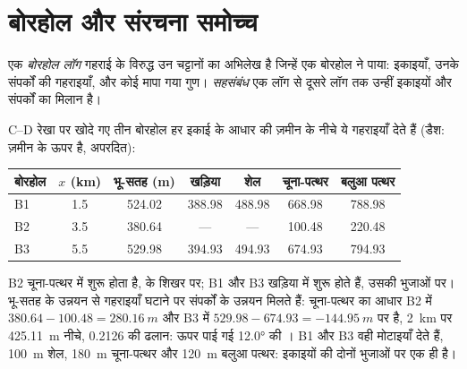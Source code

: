 \section{बोरहोल और संरचना समोच्च}\label{sec:b1:cross-sections:boreholes}

\begin{definition}[बोरहोल लॉग, सहसंबंध]\label{def:b1:cross-sections:log}
एक \emph{बोरहोल लॉग} गहराई के विरुद्ध उन चट्टानों का अभिलेख है जिन्हें एक बोरहोल ने पाया:
इकाइयाँ, उनके संपर्कों की गहराइयाँ, और कोई मापा गया गुण। \emph{सहसंबंध} एक लॉग से
दूसरे लॉग तक उन्हीं इकाइयों और संपर्कों का मिलान है।
\end{definition}

C--D रेखा पर खोदे गए तीन बोरहोल हर इकाई के आधार की ज़मीन के नीचे ये गहराइयाँ देते हैं (डैश:  ज़मीन के
ऊपर है, अपरदित):
\begin{center}
\small
\begin{tabular}{lcccccc}
\hline
बोरहोल & $x$ (km) & भू-सतह (m) & खड़िया & शेल & चूना-पत्थर & बलुआ पत्थर \\
\hline
B1 & 1.5 & 524.02 & 388.98 & 488.98 & 668.98 & 788.98 \\
B2 & 3.5 & 380.64 & --- & --- & 100.48 & 220.48 \\
B3 & 5.5 & 529.98 & 394.93 & 494.93 & 674.93 & 794.93 \\
\hline
\end{tabular}
\end{center}
B2 चूना-पत्थर में शुरू होता है,  के शिखर पर; B1 और B3 खड़िया में शुरू होते हैं, उसकी भुजाओं पर। भू-सतह के उन्नयन
से गहराइयाँ घटाने पर संपर्कों के उन्नयन मिलते हैं: चूना-पत्थर का आधार B2 में $380.64 - 100.48 = \qty{280.16}{m}$ और B3 में
$529.98 - 674.93 =
\qty{-144.95}{m}$ पर है, \qty{2}{km} पर \qty{425.11}{m} नीचे, \num{0.2126} की ढलान: ऊपर पाई गई
\ang{12.0} की । B1 और B3 वही मोटाइयाँ देते हैं, \qty{100}{m} शेल, \qty{180}{m} चूना-पत्थर और \qty{120}{m} बलुआ
पत्थर: इकाइयों की दोनों भुजाओं पर एक ही  है।

